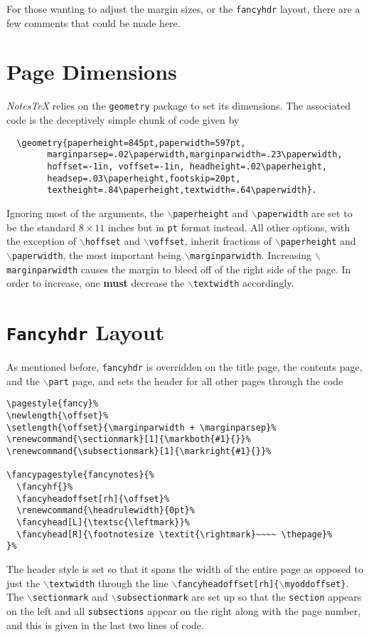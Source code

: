 For those wanting to adjust the margin sizes, or the \texttt{fancyhdr} layout, there are a few comments that could be made here.
\section{Page Dimensions}
\textit{NotesTeX} relies on the \texttt{geometry} package to set its dimensions. The associated code is the deceptively simple chunk of code given by
\begin{verbatim}
  \geometry{paperheight=845pt,paperwidth=597pt,
        marginparsep=.02\paperwidth,marginparwidth=.23\paperwidth,
        hoffset=-1in, voffset=-1in, headheight=.02\paperheight,
        headsep=.03\paperheight,footskip=20pt,
        textheight=.84\paperheight,textwidth=.64\paperwidth}.
\end{verbatim}
Ignoring most of the arguments, the \texttt{$\backslash$paperheight} and \texttt{$\backslash$paperwidth} are set to be the standard $8\times11$ inches but in \texttt{pt} format instead. All other options, with the exception of \texttt{$\backslash$hoffset} and \texttt{$\backslash$voffset}, inherit fractions of \texttt{$\backslash$paperheight} and \texttt{$\backslash$paperwidth}, the most important being \texttt{$\backslash$marginparwidth}. Increasing \texttt{$\backslash$marginparwidth} causes the margin to bleed off of the right side of the page. In order to increase, one \textbf{must} decrease the \texttt{$\backslash$textwidth} accordingly.


\section{\texttt{Fancyhdr} Layout}
As mentioned before, \texttt{fancyhdr} is overridden on the title page, the contents page, and the \texttt{$\backslash$part} page, and sets the header for all other pages through the code
\begin{verbatim}
\pagestyle{fancy}%
\newlength{\offset}%
\setlength{\offset}{\marginparwidth + \marginparsep}%
\renewcommand{\sectionmark}[1]{\markboth{#1}{}}%
\renewcommand{\subsectionmark}[1]{\markright{#1}{}}%

\fancypagestyle{fancynotes}{%
  \fancyhf{}%
  \fancyheadoffset[rh]{\offset}%
  \renewcommand{\headrulewidth}{0pt}%
  \fancyhead[L]{\textsc{\leftmark}}%
  \fancyhead[R]{\footnotesize \textit{\rightmark}~~~~ \thepage}%
}%
\end{verbatim}
The header style is set so that it spans the width of the entire page as opposed to just the \texttt{$\backslash$textwidth} through the line \texttt{$\backslash$fancyheadoffset[rh]\{$\backslash$myoddoffset\}}. The \texttt{$\backslash$sectionmark} and \texttt{$\backslash$subsectionmark} are set up so that the \texttt{section} appears on the left and all \texttt{subsections} appear on the right along with the page number, and this is given in the last two lines of code.